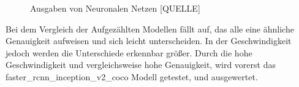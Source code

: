 \documentclass[a4paper,12pt,oneside]{article}
\begin{document}
\begin{figure} 
	[h]
	\centering
    \label{img:Mask} 
    \label{img:Boxes} 
\caption{Ausgaben von Neuronalen Netzen [QUELLE]} 
\end{figure} 

\newpage

Bei dem Vergleich der Aufgezählten Modellen fällt auf, das alle eine ähnliche Genauigkeit aufweisen und sich leicht unterscheiden. In der Geschwindigkeit jedoch werden die Unterschiede erkennbar größer. Durch die hohe Geschwindigkeit und vergleichsweise hohe Genauigkeit, wird vorerst das faster\_rcnn\_inception\_v2\_coco Modell getestet, und ausgewertet.
\\
\end{document}
